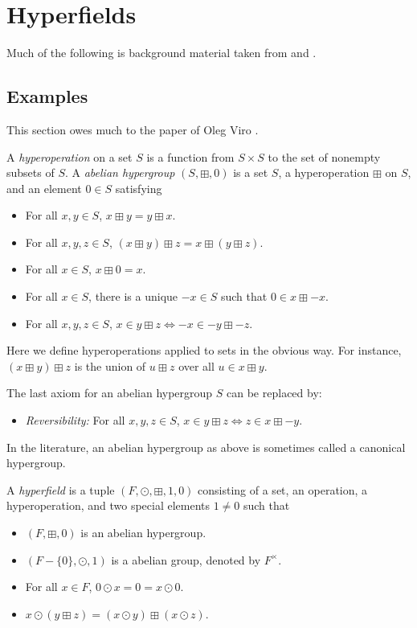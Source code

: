 \documentclass[10pt, preprint]{article}
\theoremstyle{definition}
\begin{document}
\section{Hyperfields}

Much of the following is background material taken from
\cite{Viro} and \cite{Baker-Bowler}.

\subsection{Examples}

This section owes much to the paper of Oleg Viro \cite{Viro}.

A \emph{hyperoperation} on a set $S$ is a function from $S \times S$ to
the set of nonempty subsets of $S$. A \emph{abelian hypergroup}
$(S, \boxplus , 0)$ is a set $S$, a hyperoperation $\boxplus $ on
$S$, and an element $0 \in S$ satisfying
%
\begin{itemize}%
\item
For all $x,y \in S$, $x \boxplus y = y \boxplus x$.
%
\item
For all $x,y,z \in S$, $(x \boxplus y) \boxplus z = x \boxplus (y
\boxplus z)$.
%
\item
For all $x \in S$, $x \boxplus 0 = x$.
%
\item
For all $x \in S$, there is a unique $-x\in S$ such that $0\in x
\boxplus -x$.
%
\item
For all $x,y,z \in S$, $x \in y \boxplus z \Leftrightarrow -x \in -y
\boxplus -z$.
\end{itemize}

Here we define hyperoperations applied to sets in the obvious way. For
instance, $(x \boxplus y) \boxplus z$ is the union of $u \boxplus z$
over all $u \in x \boxplus y$.

The last axiom for an abelian hypergroup $S$ can be replaced by:
%
\begin{itemize}%
\item
\emph{Reversibility:} For all $x,y,z \in S$, $x \in y \boxplus z
\Leftrightarrow z \in x \boxplus -y$.
\end{itemize}

In the literature, an abelian hypergroup as above is sometimes called
a canonical hypergroup.

A \emph{hyperfield} is a tuple $(F, \odot , \boxplus , 1, 0)$ consisting
of a set, an operation, a hyperoperation, and two special elements
$1 \neq 0$ such that
%
\begin{itemize}%
\item
$(F, \boxplus , 0)$ is an abelian hypergroup.
%
\item
$(F-\{0\}, \odot , 1)$ is a abelian group, denoted by $F^{\times }$.
%
\item
For all $x \in F$, $0 \odot x = 0 = x \odot 0$.
%
\item
$x \odot (y \boxplus z) = (x \odot y) \boxplus (x \odot z)$.
\end{itemize}
\end{document}
